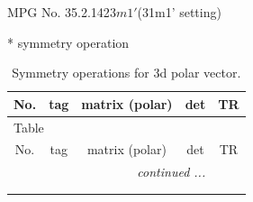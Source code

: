 \documentclass[fleqn,8pt]{jsarticle}
\begin{document}
\setcounter{MaxMatrixCols}{32}

\renewcommand{\tablename}{Table~}
\renewcommand{\figurename}{Figure~}
\begin{center}
\LARGE
MPG No. 35.2.142\quad$3m1'$\quad(31m1' setting)
\end{center}
* symmetry operation
\renewcommand{\arraystretch}{1.3}
\begin{longtable}{ccccc}
\caption{Symmetry operations for 3d polar vector.}
 \\
 \hline \hline
No. & tag & matrix (polar) & det & TR \\ \hline \endfirsthead

\multicolumn{4}{l}{\tablename\ \thetable{}} \\
 \hline \hline
No. & tag & matrix (polar) & det & TR \\ \hline \endhead

 \hline \hline
\multicolumn{4}{r}{\footnotesize\it continued ...} \\ \endfoot

 \hline \hline
\multicolumn{4}{r}{} \\ \endlastfoot


\end{longtable}
\end{document}
